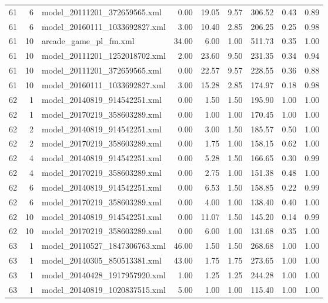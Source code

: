 \begin{table}[ht]
\begin{tabular}{rrlrrrrrr}
   61 &   6 & model\_20111201\_372659565.xml & 0.00 & 19.05 & 9.57 & 306.52 & 0.43 & 0.89 \\ 
   61 &   6 & model\_20160111\_1033692827.xml & 3.00 & 10.40 & 2.85 & 206.25 & 0.25 & 0.98 \\ 
   61 &  10 & arcade\_game\_pl\_fm.xml & 34.00 & 6.00 & 1.00 & 511.73 & 0.35 & 1.00 \\ 
   61 &  10 & model\_20111201\_1252018702.xml & 2.00 & 23.60 & 9.50 & 231.35 & 0.34 & 0.94 \\ 
   61 &  10 & model\_20111201\_372659565.xml & 0.00 & 22.57 & 9.57 & 228.55 & 0.36 & 0.88 \\ 
   61 &  10 & model\_20160111\_1033692827.xml & 3.00 & 15.28 & 2.85 & 174.97 & 0.18 & 0.98 \\ 
   62 &   1 & model\_20140819\_914542251.xml & 0.00 & 1.50 & 1.50 & 195.90 & 1.00 & 1.00 \\ 
   62 &   1 & model\_20170219\_358603289.xml & 0.00 & 1.00 & 1.00 & 170.45 & 1.00 & 1.00 \\ 
   62 &   2 & model\_20140819\_914542251.xml & 0.00 & 3.00 & 1.50 & 185.57 & 0.50 & 1.00 \\ 
   62 &   2 & model\_20170219\_358603289.xml & 0.00 & 1.75 & 1.00 & 158.15 & 0.62 & 1.00 \\ 
   62 &   4 & model\_20140819\_914542251.xml & 0.00 & 5.28 & 1.50 & 166.65 & 0.30 & 0.99 \\ 
   62 &   4 & model\_20170219\_358603289.xml & 0.00 & 2.75 & 1.00 & 151.38 & 0.48 & 1.00 \\ 
   62 &   6 & model\_20140819\_914542251.xml & 0.00 & 6.53 & 1.50 & 158.85 & 0.22 & 0.99 \\ 
   62 &   6 & model\_20170219\_358603289.xml & 0.00 & 4.00 & 1.00 & 138.40 & 0.40 & 1.00 \\ 
   62 &  10 & model\_20140819\_914542251.xml & 0.00 & 11.07 & 1.50 & 145.20 & 0.14 & 0.99 \\ 
   62 &  10 & model\_20170219\_358603289.xml & 0.00 & 6.00 & 1.00 & 131.68 & 0.35 & 1.00 \\ 
   63 &   1 & model\_20110527\_1847306763.xml & 46.00 & 1.50 & 1.50 & 268.68 & 1.00 & 1.00 \\ 
   63 &   1 & model\_20140305\_850513381.xml & 43.00 & 1.75 & 1.75 & 273.65 & 1.00 & 1.00 \\ 
   63 &   1 & model\_20140428\_1917957920.xml & 1.00 & 1.25 & 1.25 & 244.28 & 1.00 & 1.00 \\ 
   63 &   1 & model\_20140819\_1020837515.xml & 5.00 & 1.00 & 1.00 & 115.40 & 1.00 & 1.00 \\ 

\end{tabular}
\end{table}
